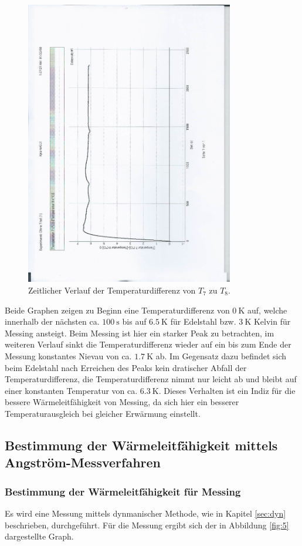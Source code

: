 \begin{figure}[H]
  \centering
  \includegraphics[height=12.5cm, angle=270]{scan-5.jpg}
  \caption{Zeitlicher Verlauf der Temperaturdifferenz von $T_7$ zu $T_8$.}
  \label{fig:4}
\end{figure}

Beide Graphen zeigen zu Beginn eine Temperaturdifferenz von $\SI{0}{\kelvin}$ auf, welche innerhalb der nächsten ca. $\SI{100}{\second}$ bis auf $\SI{6.5}{\kelvin}$ für Edelstahl bzw. $\SI{3}{\kelvin}$ Kelvin für Messing ansteigt.
Beim Messing ist hier ein starker Peak zu betrachten, im weiteren Verlauf sinkt die Temperaturdifferenz wieder auf ein bis zum Ende der Messung konstantes Nievau von ca. $\SI{1.7}{\kelvin}$ ab.
Im Gegensatz dazu befindet sich beim Edelstahl nach Erreichen des Peaks kein dratischer Abfall der Temperaturdifferenz, die Temperaturdifferenz nimmt nur leicht ab und bleibt auf einer konstanten Temperatur von ca. $\SI{6.3}{\kelvin}$.
Dieses Verhalten ist ein Indiz für die bessere Wärmeleitfähigkeit von Messing, da sich hier ein besserer Temperaturausgleich bei gleicher Erwärmung einstellt.

\subsection{Bestimmung der Wärmeleitfähigkeit mittels Angström-Messverfahren}
\subsubsection{Bestimmung der Wärmeleitfähigkeit für Messing}
Es wird eine Messung mittels dynmanischer Methode, wie in Kapitel \ref{sec:dyn} beschrieben, durchgeführt.
Für die Messung ergibt sich der in Abbildung \ref{fig:5} dargestellte Graph.

